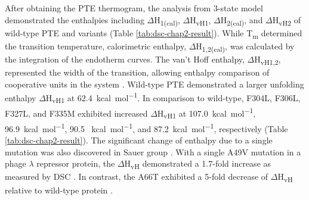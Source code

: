 \begin{refsection}
After obtaining the PTE thermogram, the analysis from 3-state model
demonstrated the enthalpies including $\Delta$H\textsubscript{1(cal)},
$\Delta$H\textsubscript{vH1}, $\Delta$H\textsubscript{2(cal)}, and
$\Delta$H\textsubscript{vH2} of wild-type PTE and variants (Table
\ref{tab:dsc-chap2-result}). While T\textsubscript{m} determined the transition
temperature, calorimetric enthalpy, $\Delta$H\textsubscript{1,2(cal)}, was
calculated by the integration of the endotherm curves. The van't
Hoff enthalpy, $\Delta$H\textsubscript{vH1,2}, represented the width of the
transition, allowing enthalpy comparison of cooperative units in the
system \cite{Privalov2009}. Wild-type PTE demonstrated a larger unfolding
enthalpy $\Delta$H\textsubscript{vH1} at \SI{62.4}{kcal\per\mole}. In
comparison to wild-type, F304L, F306L, F327L, and F335M exhibited increased
$\Delta$H\textsubscript{vH1} at \SI{107.0}{kcal\per\mole},
\SI{96.9}{kcal\per\mole}, 90.5 \SI{}{kcal\per\mole}, and
\SI{87.2}{kcal\per\mole}, respectively (Table \ref{tab:dsc-chap2-result}). The
significant change of enthalpy due to a single mutation was also discovered in
Sauer group \cite{Hecht1984a}. With a single A49V mutation in a phage
$\lambda$ repressor protein, the $\Delta$H\textsubscript{vH} demonstrated a
1.7-fold increase as measured by DSC \cite{Hecht1984a}. In contrast, the A66T
exhibited a 5-fold decrease of $\Delta$H\textsubscript{vH} relative to
wild-type protein \cite{Hecht1984a}. 


\end{refsection}

